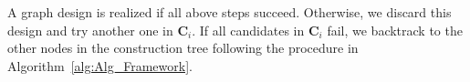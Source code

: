 A graph design is realized if all above steps succeed. Otherwise, we discard this design and try another one in $\mathbf{C}_i$. If all candidates in $\mathbf{C}_i$ fail, we backtrack to the other nodes in the construction tree following the procedure in Algorithm~\ref{alg:Alg_Framework}.


















